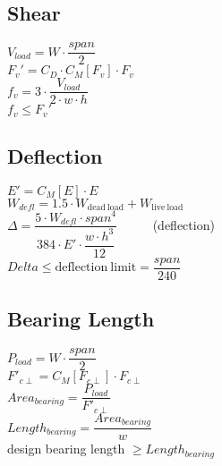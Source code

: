 \documentclass[12pt]{article}
\begin{document}
\subsection{Shear}

$V_{load} = W \cdot \dfrac{span}{2}$
\\[1.0ex]
$F_v' = C_D \cdot C_M[F_v] \cdot F_v$
\\[1.0ex]
$f_v = 3 \cdot \dfrac{V_{load}}{2 \cdot w \cdot h}$
\\[1.0ex]
$f_v \leq F_v'$

\newpage

\subsection{Deflection}

$E' = C_M[E] \cdot E$
\\[1.0ex]
$W_{defl} = 1.5 \cdot W_{\mathrm{dead~load}} + W_{\mathrm{live~load}}$
\\[1.0ex]
$\Delta = \dfrac{5 \cdot W_{defl} \cdot span^4}
                {384 \cdot E' \cdot \dfrac{w \cdot h^3}{12}}$
		~~~~~(deflection)
\\[1.0ex]
$Delta \leq {\mathrm{deflection~limit}} = \dfrac{span}{240}$

\subsection{Bearing Length}

$P_{load} = W \cdot \dfrac{span}{2}$
\\[1.0ex]
$F'_{c\perp} = C_M[F_{c\perp}] \cdot F_{c\perp}$
\\[1.0ex]
$Area_{bearing} = \dfrac{P_{load}}{F'_{c\perp}}$
\\[1.0ex]
$Length_{bearing} = \dfrac{Area_{bearing}}{w}$
\\[1.0ex]
design bearing length $\geq Length_{bearing}$
\end{document}
